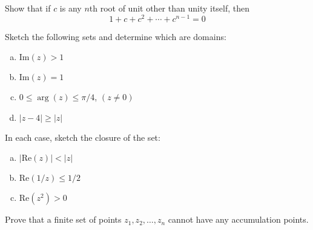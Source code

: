 \documentclass{article}
\begin{document}
\begin{problem}
Show that if $c$ is any $n$th root of unit other than unity itself, then
\[ 1 + c + c^{2} + \cdots + c^{n-1} = 0 \]
\end{problem}

\begin{problem}
Sketch the following sets and determine which are domains:
\begin{enumerate}[(a)]
\item $\text{Im}(z)>1$
\item $\text{Im}(z)=1$
\item $0 \le \arg(z) \le \pi/4$, $(z\ne0)$
\item $|z-4| \ge |z|$
\end{enumerate}
\end{problem}

\begin{problem}
In each case, sketch the closure of the set:
\begin{enumerate}[(a)]
\item $|\text{Re}(z)| < |z|$
\item $\text{Re}(1/z) \le 1/2$
\item $\text{Re}(z^{2}) > 0$
\end{enumerate}
\end{problem}

\begin{problem}
Prove that a finite set of points $z_{1},z_{2},\dots,z_{n}$ cannot have any accumulation points.
\end{problem}
\end{document}
